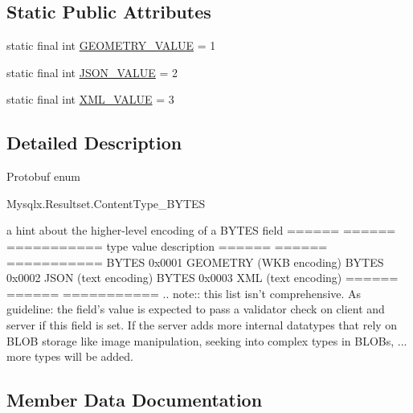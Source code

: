 \subsection*{Static Public Attributes}
\begin{DoxyCompactItemize}
\item 
static final int \mbox{\hyperlink{enumcom_1_1mysql_1_1cj_1_1x_1_1protobuf_1_1_mysqlx_resultset_1_1_content_type___b_y_t_e_s_ab33597ac9ba091ef91e0a25e98d47b8b}{G\+E\+O\+M\+E\+T\+R\+Y\+\_\+\+V\+A\+L\+UE}} = 1
\item 
static final int \mbox{\hyperlink{enumcom_1_1mysql_1_1cj_1_1x_1_1protobuf_1_1_mysqlx_resultset_1_1_content_type___b_y_t_e_s_af38b5949b3d62070d0c88993b9a1f0dd}{J\+S\+O\+N\+\_\+\+V\+A\+L\+UE}} = 2
\item 
static final int \mbox{\hyperlink{enumcom_1_1mysql_1_1cj_1_1x_1_1protobuf_1_1_mysqlx_resultset_1_1_content_type___b_y_t_e_s_aadfad96a778ee358721f0eb095cb72a4}{X\+M\+L\+\_\+\+V\+A\+L\+UE}} = 3
\end{DoxyCompactItemize}


\subsection{Detailed Description}
Protobuf enum
\begin{DoxyCode}
Mysqlx.Resultset.ContentType\_BYTES 
\end{DoxyCode}



\begin{DoxyPre}
a hint about the higher-level encoding of a BYTES field
====== ====== ===========
type   value  description
====== ====== ===========
BYTES  0x0001 GEOMETRY (WKB encoding)
BYTES  0x0002 JSON (text encoding)
BYTES  0x0003 XML (text encoding)
====== ====== ===========
.. note::
  this list isn't comprehensive. As guideline: the field's value is expected
  to pass a validator check on client and server if this field is set.
  If the server adds more internal datatypes that rely on BLOB storage
  like image manipulation, seeking into complex types in BLOBs, ... more
  types will be added.
\end{DoxyPre}
 

\subsection{Member Data Documentation}
\mbox{\label{enumcom_1_1mysql_1_1cj_1_1x_1_1protobuf_1_1_mysqlx_resultset_1_1_content_type___b_y_t_e_s_a2f05973734af4ee7e389c32aa11c9a90}} 
